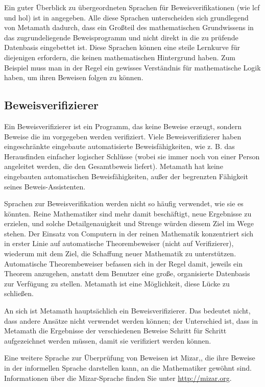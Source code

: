 Ein guter Überblick zu übergeordneten Sprachen für Beweisverifikationen (wie {\sc lcf} und {\sc hol}) ist in \cite{Harrison} angegeben.  Alle diese Sprachen unterscheiden sich grundlegend von Metamath dadurch, dass ein Großteil des mathematischen Grundwissens in das zugrundeliegende Beweisprogramm und nicht direkt in die zu prüfende Datenbasis eingebettet ist.
Diese Sprachen können eine steile Lernkurve für diejenigen erfordern, die keinen mathematischen Hintergrund haben.  Zum Beispiel muss man in der Regel ein gewisses Verständnis für mathematische Logik haben, um ihren Beweisen folgen zu können.

\subsection{Beweisverifizierer}\label{proofverifiers}

Ein Beweisverifizierer ist ein Programm, das keine Beweise erzeugt, sondern Beweise die im vorgegeben werden verifiziert.  Viele Beweisverifizierer haben eingeschränkte eingebaute automatisierte Beweisfähigkeiten, wie z. B. das Herausfinden einfacher logischer Schlüsse (wobei sie immer noch von einer Person angeleitet werden, die den Gesamtbeweis liefert).  Metamath hat keine eingebauten automatischen Beweisfähigkeiten, außer der begrenzten Fähigkeit seines Beweis-Assistenten.

Sprachen zur Beweisverifikation werden nicht so häufig verwendet, wie sie es könnten.
Reine Mathematiker sind mehr damit beschäftigt, neue Ergebnisse zu erzielen, und solche Detailgenauigkeit und Strenge würden diesem Ziel im Wege stehen.  
Der Einsatz von Computern in der reinen Mathematik konzentriert sich in erster Linie auf automatische Theorembeweiser (nicht auf Verifizierer), wiederum mit dem Ziel, die Schaffung neuer Mathematik zu unterstützen.
Automatische Theorembeweiser befassen sich in der Regel damit, jeweils ein Theorem anzugehen, anstatt dem Benutzer eine große, organisierte Datenbasis zur Verfügung zu stellen.  Metamath ist eine Möglichkeit, diese Lücke zu schließen.

An sich ist Metamath hauptsächlich ein Beweisverifizierer.
Das bedeutet nicht, dass andere Ansätze nicht verwendet werden können; der Unterschied ist, dass in Metamath die Ergebnisse der verschiedenen Beweise Schritt für Schritt aufgezeichnet werden müssen, damit sie verifiziert werden können.

Eine weitere Sprache zur Überprüfung von Beweisen ist Mizar,, die ihre Beweise in der informellen Sprache darstellen kann, an die Mathematiker gewöhnt sind. Informationen über die Mizar-Sprache finden Sie unter \url{http://mizar.org}.

